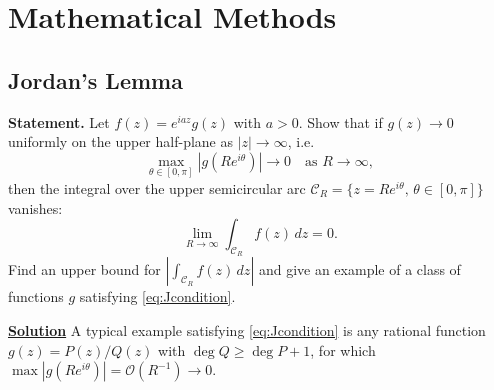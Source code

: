 \section{Mathematical Methods}
\subsection{Jordan's Lemma}

\textbf{Statement.} Let $f(z) = e^{iaz}g(z)$ with $a > 0$. Show that if
$g(z)\to 0$ uniformly on the upper half-plane as $|z|\to\infty$, i.e.
\begin{equation}
    \max_{\theta\in[0,\pi]}|g(Re^{i\theta})| \to 0 \quad \text{as } R\to\infty,
    \label{eq:Jcondition}
\end{equation}
then the integral over the upper semicircular arc $\mathcal{C}_R =
\{z = Re^{i\theta},\, \theta\in[0,\pi]\}$ vanishes:
\begin{equation}
    \lim_{R\to\infty}\int_{\mathcal{C}_R}f(z)\,dz = 0.
\end{equation}
Find an upper bound for $\left|\int_{\mathcal{C}_R}f(z)\,dz\right|$ and
give an example of a class of functions $g$ satisfying \eqref{eq:Jcondition}.

\noindent\underline{\textbf{Solution}} A typical example satisfying
\eqref{eq:Jcondition} is any rational function $g(z) = P(z)/Q(z)$ with
$\deg Q \geq \deg P + 1$, for which
$\max|g(Re^{i\theta})| = \mathcal{O}(R^{-1})\to 0$.

